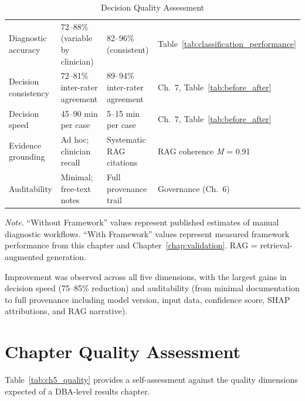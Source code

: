 \begin{table}[H]
\tablestripes
\begin{tabularx}{\textwidth}{L L L L}
\toprule
{} &  &  &  \\
\midrule
Diagnostic accuracy & 72--88\% (variable by clinician) & 82--96\% (consistent) & Table~\ref{tab:classification_performance} \\
\addlinespace
Decision consistency & 72--81\% inter-rater agreement & 89--94\% inter-rater agreement & Ch.~7, Table~\ref{tab:before_after} \\
\addlinespace
Decision speed & 45--90 min per case & 5--15 min per case & Ch.~7, Table~\ref{tab:before_after} \\
\addlinespace
Evidence grounding & Ad hoc; clinician recall & Systematic RAG citations & RAG coherence \textit{M} = 0.91 \\
\addlinespace
Auditability & Minimal; free-text notes & Full provenance trail & Governance (Ch.~6) \\
\bottomrule
\end{tabularx}
\caption{Decision Quality Assessment}
\label{tab:decision_quality}
\vspace{0.5em}\noindent\textit{Note.} ``Without Framework'' values represent published estimates of manual diagnostic workflows. ``With Framework'' values represent measured framework performance from this chapter and Chapter~\ref{chap:validation}. RAG = retrieval-augmented generation.
\end{table}

Improvement was observed across all five dimensions, with the largest gains in decision speed (75--85\% reduction) and auditability (from minimal documentation to full provenance including model version, input data, confidence score, SHAP attributions, and RAG narrative).


\section{Chapter Quality Assessment}
\label{sec:ch5_quality}

Table~\ref{tab:ch5_quality} provides a self-assessment against the quality dimensions expected of a DBA-level results chapter.

